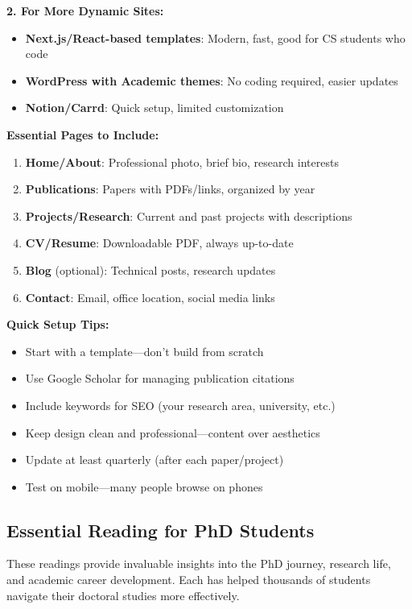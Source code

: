 \documentclass[11pt,a4paper]{article}
\begin{document}
\textbf{2. For More Dynamic Sites:}
\begin{itemize}
    \item \textbf{Next.js/React-based templates}: Modern, fast, good for CS students who code
    \item \textbf{WordPress with Academic themes}: No coding required, easier updates
    \item \textbf{Notion/Carrd}: Quick setup, limited customization
\end{itemize}

\textbf{Essential Pages to Include:}
\begin{enumerate}
    \item \textbf{Home/About}: Professional photo, brief bio, research interests
    \item \textbf{Publications}: Papers with PDFs/links, organized by year
    \item \textbf{Projects/Research}: Current and past projects with descriptions
    \item \textbf{CV/Resume}: Downloadable PDF, always up-to-date
    \item \textbf{Blog} (optional): Technical posts, research updates
    \item \textbf{Contact}: Email, office location, social media links
\end{enumerate}

\textbf{Quick Setup Tips:}
\begin{itemize}
    \item Start with a template—don't build from scratch
    \item Use Google Scholar for managing publication citations
    \item Include keywords for SEO (your research area, university, etc.)
    \item Keep design clean and professional—content over aesthetics
    \item Update at least quarterly (after each paper/project)
    \item Test on mobile—many people browse on phones
\end{itemize}


\subsection{Essential Reading for PhD Students}

\begin{tcolorbox}[colback=blue!5,colframe=darkblue,title=Must-Read Books and Articles]
These readings provide invaluable insights into the PhD journey, research life, and academic career development. Each has helped thousands of students navigate their doctoral studies more effectively.
\end{tcolorbox}
\end{document}
